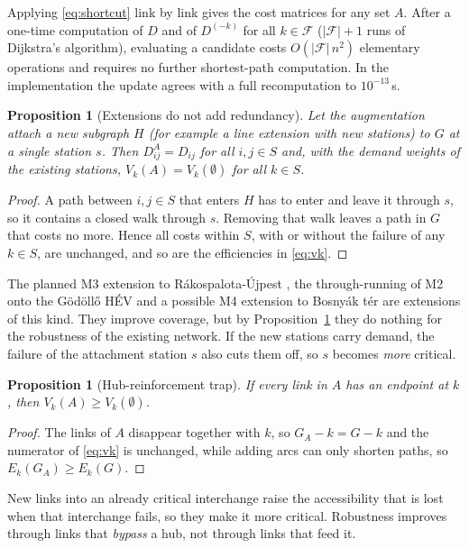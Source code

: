 \documentclass[12pt,a4paper]{article}
\theoremstyle{plain}
\newtheorem{proposition}[theorem]{Proposition}
\theoremstyle{definition}
\theoremstyle{remark}
\begin{document}
Applying \eqref{eq:shortcut} link by link gives the cost matrices for any set
$A$.  After a one-time computation of $D$ and of $D^{(-k)}$ for all
$k\in\mathcal F$ ($|\mathcal F|+1$ runs of Dijkstra's algorithm), evaluating a
candidate costs $O(|\mathcal F|\,n^2)$ elementary operations and requires no
further shortest-path computation.  In the implementation the update agrees
with a full recomputation to $10^{-13}$\,s.

\begin{proposition}[Extensions do not add redundancy]
\label{prop:pendant}
Let the augmentation attach a new subgraph $H$ (for example a line extension
with new stations) to $G$ at a single station $s$.  Then $D^A_{ij}=D_{ij}$ for all
$i,j\in S$ and, with the demand weights of the existing stations,
$V_k(A)=V_k(\emptyset)$ for all $k\in S$.
\end{proposition}

\begin{proof}
A path between $i,j\in S$ that enters $H$ has to enter and leave it through
$s$, so it contains a closed walk through $s$.  Removing that walk leaves a path
in $G$ that costs no more.  Hence all costs within $S$, with or without the
failure of any $k\in S$, are unchanged, and so are the efficiencies in
\eqref{eq:vk}.
\end{proof}

The planned M3 extension to Rákospalota-Újpest \citep{telex_m3_2026}, the
through-running of M2 onto the Gödöllő HÉV \citep{gov_h8h9} and a possible
M4 extension to Bosnyák tér are extensions of this kind.  They improve
coverage, but by Proposition~\ref{prop:pendant} they do nothing for the
robustness of the existing network.  If the new stations carry demand, the
failure of the attachment station $s$ also cuts them off, so $s$ becomes
\emph{more} critical.

\begin{proposition}[Hub-reinforcement trap]
\label{prop:trap}
If every link in $A$ has an endpoint at $k$, then $V_k(A)\ge V_k(\emptyset)$.
\end{proposition}

\begin{proof}
The links of $A$ disappear together with $k$, so $G_A-k=G-k$ and the
numerator of \eqref{eq:vk} is unchanged, while adding arcs can only shorten
paths, so $E_k(G_A)\ge E_k(G)$.
\end{proof}

New links into an already critical interchange raise the accessibility that is
lost when that interchange fails, so they make it more critical.  Robustness
improves through links that \emph{bypass} a hub, not through links that feed it.
\end{document}

